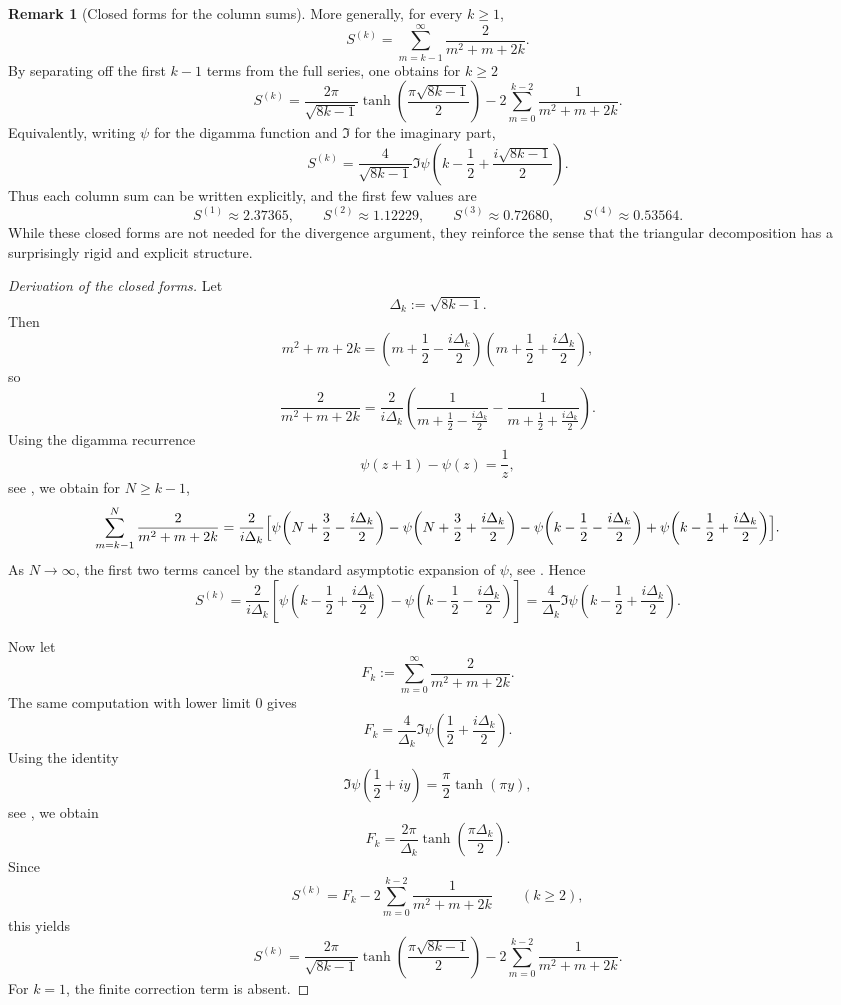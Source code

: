 \documentclass{article}
\theoremstyle{theorem}
\theoremstyle{definition}
\newtheorem{remark}[theorem]{Remark}
\begin{document}
\begin{remark}[Closed forms for the column sums]
More generally, for every \(k \ge 1\),
\[
S^{(k)}
=
\sum_{m=k-1}^{\infty} \frac{2}{m^2+m+2k}.
\]
By separating off the first \(k-1\) terms from the full series, one obtains for \(k \ge 2\)
\[
S^{(k)}
=
\frac{2\pi}{\sqrt{8k-1}}
\tanh\!\left(\frac{\pi\sqrt{8k-1}}{2}\right)
-
2\sum_{m=0}^{k-2}\frac{1}{m^2+m+2k}.
\]
Equivalently, writing \(\psi\) for the digamma function and \(\Im\) for the imaginary part,
\[
S^{(k)}
=
\frac{4}{\sqrt{8k-1}}
\Im \psi\!\left(k-\frac12+\frac{i\sqrt{8k-1}}{2}\right).
\]
Thus each column sum can be written explicitly, and the first few values are
\[
S^{(1)} \approx 2.37365,\qquad
S^{(2)} \approx 1.12229,\qquad
S^{(3)} \approx 0.72680,\qquad
S^{(4)} \approx 0.53564.
\]
While these closed forms are not needed for the divergence argument, they reinforce the sense that the triangular decomposition has a surprisingly rigid and explicit structure.
\end{remark}

\begin{proof}[Derivation of the closed forms]
Let
\[
\Delta_k:=\sqrt{8k-1}.
\]
Then
\[
m^2+m+2k
=
\left(m+\frac12-\frac{i\Delta_k}{2}\right)
\left(m+\frac12+\frac{i\Delta_k}{2}\right),
\]
so
\[
\frac{2}{m^2+m+2k}
=
\frac{2}{i\Delta_k}
\left(
\frac{1}{m+\frac12-\frac{i\Delta_k}{2}}
-
\frac{1}{m+\frac12+\frac{i\Delta_k}{2}}
\right).
\]
Using the digamma recurrence
\[
\psi(z+1)-\psi(z)=\frac1z,
\]
see \cite[\href{https://dlmf.nist.gov/5.5.E2}{(5.5.2)}]{NIST:DLMF}, we obtain for \(N\ge k-1\),
\[
\sum_{m=k-1}^{N}\frac{2}{m^2+m+2k}
=
\frac{2}{i\Delta_k}
\Bigl[
\psi\!\left(N+\frac32-\frac{i\Delta_k}{2}\right)
-\psi\!\left(N+\frac32+\frac{i\Delta_k}{2}\right)
-\psi\!\left(k-\frac12-\frac{i\Delta_k}{2}\right)
+\psi\!\left(k-\frac12+\frac{i\Delta_k}{2}\right)
\Bigr].
\]
As \(N\to\infty\), the first two terms cancel by the standard asymptotic expansion of
\(\psi\), see \cite[\href{https://dlmf.nist.gov/5.11.E2}{(5.11.2)}]{NIST:DLMF}. Hence
\[
S^{(k)}
=
\frac{2}{i\Delta_k}
\left[
\psi\!\left(k-\frac12+\frac{i\Delta_k}{2}\right)
-
\psi\!\left(k-\frac12-\frac{i\Delta_k}{2}\right)
\right]
=
\frac{4}{\Delta_k}
\Im \psi\!\left(k-\frac12+\frac{i\Delta_k}{2}\right).
\]

Now let
\[
F_k:=\sum_{m=0}^{\infty}\frac{2}{m^2+m+2k}.
\]
The same computation with lower limit \(0\) gives
\[
F_k=\frac{4}{\Delta_k}\Im\psi\!\left(\frac12+\frac{i\Delta_k}{2}\right).
\]
Using the identity
\[
\Im\psi\!\left(\frac12+iy\right)=\frac{\pi}{2}\tanh(\pi y),
\]
see \cite[\href{https://dlmf.nist.gov/5.4.E17}{(5.4.17)}]{NIST:DLMF}, we obtain
\[
F_k
=
\frac{2\pi}{\Delta_k}\tanh\!\left(\frac{\pi\Delta_k}{2}\right).
\]
Since
\[
S^{(k)}=
F_k-2\sum_{m=0}^{k-2}\frac{1}{m^2+m+2k}
\qquad (k\ge 2),
\]
this yields
\[
S^{(k)}
=
\frac{2\pi}{\sqrt{8k-1}}
\tanh\!\left(\frac{\pi\sqrt{8k-1}}{2}\right)
-
2\sum_{m=0}^{k-2}\frac{1}{m^2+m+2k}.
\]
For \(k=1\), the finite correction term is absent.
\end{proof}
\end{document}
